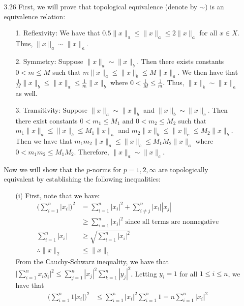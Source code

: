 \documentclass[letterpaper,12pt]{article}
\theoremstyle{definition}
\begin{document}
\begin{enumerate}
        \item[3.26]
        First, we will prove that topological equivalence (denote by $\sim$) is an equivalence relation:
          \begin{enumerate}
            \item[1.] Reflexivity:
            We have that $0.5\|x\|_a \leq \|x\|_a \leq 2\|x\|_a$ for all $x \in X$. Thus, $\|x\|_a \sim \|x\|_a$.
            \item[2.] Symmetry:
            Suppose $\|x\|_a \sim \|x\|_b$. Then there exists constants $0 < m \leq M$ such that $m\|x\|_a \leq \|x\|_b \leq M\|x\|_a$. We then have that $\frac{1}{M}\|x\|_b \leq \|x\|_a \leq \frac{1}{m}\|x\|_b$ where $0 < \frac{1}{M} \leq \frac{1}{m}$. Thus, $\|x\|_b \sim \|x\|_a$ as well.
            \item[3.] Transitivity:
            Suppose $\|x\|_a \sim \|x\|_b$ and $\|x\|_b \sim \|x\|_c$. Then there exist constants $0 < m_1 \leq M_1$ and $0 < m_2 \leq M_2$ such that $m_1\|x\|_a \leq \|x\|_b \leq M_1\|x\|_a$ and $m_2\|x\|_b \leq \|x\|_c \leq M_2\|x\|_b$. Then we have that $m_1m_2\|x\|_a \leq \|x\|_c \leq M_1M_2\|x\|_a$ where $0 < m_1m_2 \leq M_1M_2$. Therefore, $\|x\|_a \sim \|x\|_c$.
          \end{enumerate}
          Now we will show that the $p$-norms for $p = 1,2,\infty$ are topologically equivalent by establishing the following inequalities:
          \begin{enumerate}
            \item[(i)]
              First, note that we have:
              \begin{align*}
                \Big(\sum_{i=1}^n |x_i|\Big)^2 &= \sum_{i=1}^n |x_i|^2 + \sum_{i\neq j}^n |x_i||x_j| \\
                & \geq \sum_{i=1}^n |x_i|^2 \text{  since all terms are nonnegative} \\
                \sum_{i=1}^n |x_i| & \geq \sqrt{\sum_{i=1}^n |x_i|^2} \\
                \therefore  \|x\|_2 & \leq \|x\|_1
              \end{align*}
              From the Cauchy-Schwarz inequality, we have that $\Big|\sum_{i=1}^n x_iy_i\Big|^2 \leq \sum_{j=1}^n |x_j|^2 \sum_{k=1}^n |y_j|^2$. Letting $y_i = 1$ for all $1 \leq i \leq n$, we have that
              \begin{align*}
                \Big(\sum_{i=1}^n 1|x_i|\Big)^2 & \leq \sum_{i=1}^n |x_i|^2 \sum_{i=1}^n 1 = n \sum_{i=1}^n |x_i|^2 \\

\end{align*}
\end{enumerate}
\end{enumerate}
\end{document}
